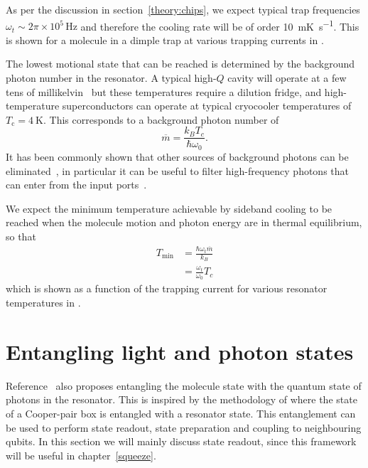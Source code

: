 As per the discussion in section~\ref{theory:chips}, we expect typical trap
frequencies $\omega_t\sim 2\pi \times 10^5\,\si{\hertz}$ and therefore the
cooling rate will be of order \SI{10}{\milli\kelvin\per\second}. This is shown
for a molecule in a dimple trap  at various trapping currents in
.

The lowest motional state that can be reached is determined by the background
photon number in the resonator. A typical high-$Q$ cavity will operate at a few
tens of millikelvin~\cite{doi:10.1063/1.3010859} but these temperatures require
a dilution fridge, and high-temperature superconductors can operate at typical
cryocooler temperatures of $T_\text{c}=\SI{4}{\kelvin}$. This corresponds
to a background photon number of
%
\begin{equation}
  \overline{m} = \frac{k_B T_c}{\hbar \omega_0}.
\end{equation}
%
It has been commonly shown that other sources of background photons can be
eliminated~\cite{Wallraff2004}, in particular it can be useful to filter
high-frequency photons that can enter from the input
ports~\cite{doi:10.1063/1.3638063}. 

We expect the minimum temperature achievable by sideband cooling to be reached
when the molecule motion and photon energy are in thermal equilibrium, so that
%
\begin{align}
  T_\text{min} &= \frac{\hbar \omega_t \overline{m}}{k_B} \\
               &= \frac{\omega_t}{\omega_0}T_c
\end{align}
%
which is shown as a function of the trapping current for various resonator
temperatures in .

\section{Entangling light and photon states}

Reference~\cite{Andre2006} also proposes entangling the molecule state with the
quantum state of photons in the resonator. This is inspired by the methodology
of  where the state of a Cooper-pair box is
entangled with a resonator state. This entanglement can be used to perform
state readout, state preparation and coupling to neighbouring qubits. In this
section we will mainly discuss state readout, since this framework will be
useful in chapter~\ref{squeeze}.

